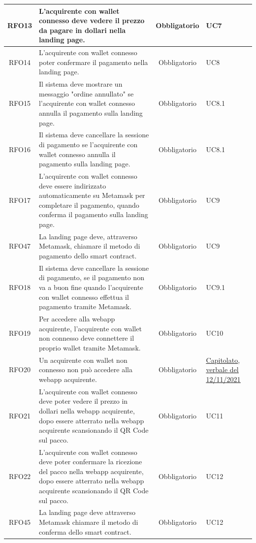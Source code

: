 \documentclass[a4paper, 12pt]{article}
\begin{document}
\begin{longtable}{|c|p{7cm}|c|p{4cm}|}
\hline
RFO13 & L'acquirente con wallet connesso deve vedere il prezzo da pagare in dollari nella landing page. & Obbligatorio & UC7 \\
\hline
RFO14 & L'acquirente con wallet connesso poter confermare il pagamento nella landing page. & Obbligatorio & UC8 \\
\hline
RFO15 & Il sistema deve mostrare un messaggio "ordine annullato" se l'acquirente con wallet connesso annulla il pagamento sulla landing page. & Obbligatorio & UC8.1 \\
\hline
RFO16 & Il sistema deve cancellare la sessione di pagamento se l'acquirente con wallet connesso annulla il pagamento sulla landing page. & Obbligatorio & UC8.1 \\
\hline
RFO17 & L'acquirente con wallet connesso deve essere indirizzato automaticamente su Metamask per completare il pagamento, quando conferma il pagamento sulla landing page. & Obbligatorio & UC9 \\
\hline
RFO47 & La landing page deve, attraverso Metamask, chiamare il metodo di pagamento dello smart contract. & Obbligatorio & UC9 \\
\hline
RFO18 & Il sistema deve cancellare la sessione di pagamento, se il pagamento non va a buon fine quando l'acquirente con wallet connesso effettua il pagamento tramite Metamask. & Obbligatorio & UC9.1 \\
\hline
RFO19 & Per accedere alla webapp acquirente, l'acquirente con wallet non connesso deve connettere il proprio wallet tramite Metamask. & Obbligatorio & UC10 \\
\hline
RFO20 & Un acquirente con wallet non connesso non può accedere alla webapp acquirente. & Obbligatorio & \underline{\href{https://www.math.unipd.it/~tullio/IS-1/2021/Progetto/C2.pdf}{Capitolato}}, \underline{\href{https://github.com/iota97/WinningSoftwareSolution/blob/main/docs/interni/verbali/2021_11_12_E/2021_11_12_E.pdf}{verbale del 12/11/2021}} \\
\hline
RFO21 & L'acquirente con wallet connesso deve poter vedere il prezzo in dollari nella webapp acquirente, dopo essere atterrato nella webapp acquirente scansionando il QR Code sul pacco. & Obbligatorio & UC11 \\
\hline
RFO22 & L'acquirente con wallet connesso deve poter confermare la ricezione del pacco nella webapp acquirente, dopo essere atterrato nella webapp acquirente scansionando il QR Code sul pacco. & Obbligatorio & UC12 \\
\hline
RFO45 & La landing page deve attraverso Metamask chiamare il metodo di conferma dello smart contract. & Obbligatorio & UC12 \\

\end{longtable}
\end{document}
